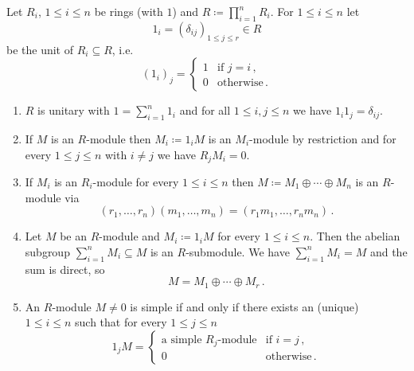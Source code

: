 \begin{lemma}\label{lemma: modules over direct sum of algebras}
  Let $R_i$, $1 \leq i \leq n$ be rings (with $1$) and $R \coloneqq \prod_{i=1}^n R_i$.
  For $1 \leq i \leq n$ let
  \[
      1_i
    = (\delta_{ij})_{1 \leq j \leq r}
    \in R
  \]
  be the unit of $R_i \subseteq R$, i.e.\
  \[
      (1_i)_j
    = \begin{cases}
        1 & \text{if } j = i \,,  \\
        0 & \text{otherwise} \,.
      \end{cases}
  \]
  \begin{enumerate}[label=\emph{\alph*)},leftmargin=*]
    \item
      $R$ is unitary with $1 = \sum_{i=1}^n 1_i$ and for all $1 \leq i,j \leq n$ we have $1_i 1_j = \delta_{ij}$.
    \item
      If $M$ is an $R$-module then $M_i \coloneqq 1_i M$ is an $M_i$-module by restriction and for every $1 \leq j \leq n$ with $i \neq j$ we have $R_j M_i = 0$.
    \item
      If $M_i$ is an $R_i$-module for every $1 \leq i \leq n$ then $M \coloneqq M_1 \oplus \dotsb \oplus M_n$ is an $R$-module via
      \[
          (r_1, \dotsc, r_n) (m_1, \dotsc, m_n)
        = (r_1 m_1, \dotsc, r_n m_n) \,.
      \]
    \item
      Let $M$ be an $R$-module and $M_i \coloneqq 1_i M$ for every $1 \leq i \leq n$.
      Then the abelian subgroup \mbox{$\sum_{i=1}^n M_i \subseteq M$} is an $R$-submodule.
      We have $\sum_{i=1}^n M_i = M$ and the sum is direct, so
      \[
        M = M_1 \oplus \dotsb \oplus M_r \,.
      \]
    \item
      An $R$-module $M \neq 0$ is simple if and only if there exists an (unique) \mbox{$1 \leq i \leq n$} such that for every $1 \leq j \leq n$
      \[
        1_j M
        = \begin{cases}
            \text{a simple $R_j$-module} & \text{if } i = j \,, \\
                                       0 & \text{otherwise} \,.
          \end{cases}
      \]
  \end{enumerate}
\end{lemma}
